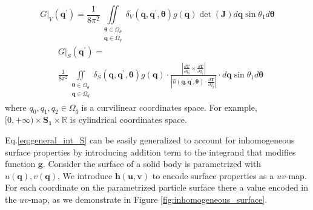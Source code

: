 \documentclass[10pt, a4paper]{article}
\begin{document}
\begin{multicols}{2}
\begin{equation}
    \left.G\right|_V (\bm{q}^{\prime}) = \frac{1}{8\pi^2} \iint 
        \limits_{\substack{
                            \bm{\theta} \in \Omega_{\theta} \\
                            \bm{q} \in \Omega_{q}}} 
        \delta_V(\bm{q}, \bm{q}^{\prime}, \bm{\theta}) g(\bm{q}) \det(\bm{J}) d \bm{q}  \sin \theta_1d \bm{\theta}
\end{equation}
\begin{equation}\label{eq:general_int_S}
    \begin{aligned}
    &\left.G\right|_S (\bm{q}^{\prime}) = \\ & \frac{1}{8\pi^2} \iint 
    \limits_{\substack{
        \bm{\theta} \in \Omega_{\theta} \\
        \bm{q} \in \Omega_{q}}}
    \delta_S(\bm{q}, \bm{q}^{\prime}, \bm{\theta}) g(\bm{q}) \cdot 
    \frac{\left|\frac{\partial \bm{T}}{\partial q_0} \times \frac{\partial \bm{T}}{\partial q_1} \right|}{\left|\hat{n}(\bm{q}, \bm{q}^{\prime}, \bm{\theta}) \cdot \frac{\partial\bm{T}}{\partial q_2}\right|} \cdot
    d\bm{q}  \sin \theta_1 d \bm{\theta}
    \end{aligned}
\end{equation}
where 
$q_0, q_1, q_2 \in \Omega_{q}$ is a curvilinear coordinates space. 
For example, $[0, +\infty) \times \bm{S_1} \times \mathbb{R}$ is cylindrical coordinates space.


Eq.\ref{eq:general_int_S} can be easily generalized to account for inhomogeneous surface properties by introducing addition term to the integrand that modifies function $\bm{g}$.
Consider the surface of a solid body is parametrized with $u(\bm{q}), v(\bm{q})$, 
We introduce $\bm{h}(\bm{u}, \bm{v})$ to encode surface properties as a $uv$-map.
For each coordinate on the parametrized particle surface there a value encoded in the $uv$-map, as we demonstrate in Figure \ref{fig:inhomogeneous_surface}.


\end{multicols}
\end{document}
